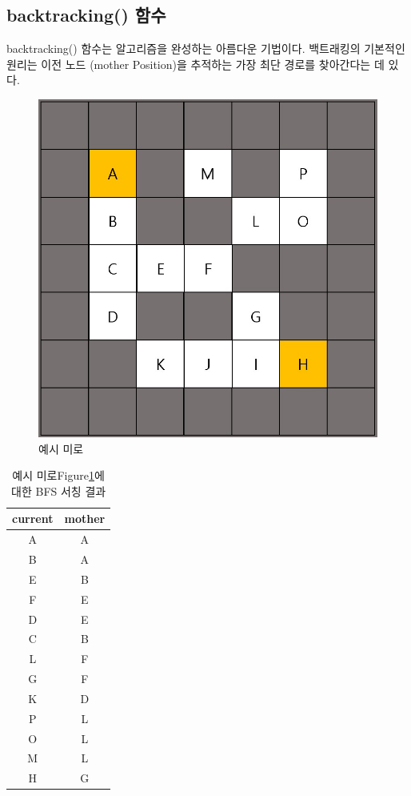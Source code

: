 \documentclass{article}
\begin{document}
\subsection{backtracking() 함수}
backtracking() 함수는 알고리즘을 완성하는 아름다운 기법이다. 백트래킹의 기본적인 원리는 이전 노드 (mother Position)을 추적하는 가장 최단 경로를 찾아간다는 데 있다.
\FloatBarrier
\begin{figure} [h]
    \centering
    \includegraphics{mazePicture.jpg}
    \caption{예시 미로}
    \label{fig:mazePic}
\end{figure}
\FloatBarrier
\FloatBarrier
\begin{table}[h]
\centering
\caption{예시 미로Figure\ref{fig:mazePic}에 대한 BFS 서칭 결과}
\label{table:tb1}
\begin{tabular}{|c|c|}
\noalign{\smallskip}\noalign{\smallskip}\hline
current & mother \\ \hline
A       & A      \\ \hline
B       & A      \\ \hline
E       & B      \\ \hline
F       & E      \\ \hline
D       & E      \\ \hline
C       & B      \\ \hline
L       & F      \\ \hline
G       & F      \\ \hline
K       & D      \\ \hline
P       & L      \\ \hline
O       & L      \\ \hline
M       & L      \\ \hline
H       & G      \\ \hline
\end{tabular}
\end{table}
\end{document}
